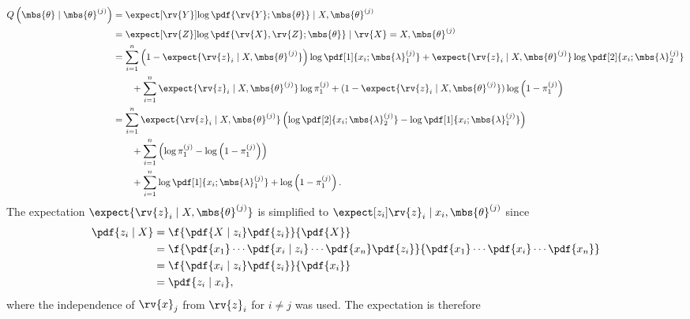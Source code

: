 \documentclass{tufte-handout}
\begin{document}
    \begin{align}
        Q\left(\mbs{\theta}\mid\mbs{\theta}^{(j)}\right) 
        &= \expect[\rv{Y}]{\log \pdf{\rv{Y} ; \mbs{\theta}} \mid X, \mbs{\theta}^{(j)}}\\
        &= \expect[\rv{Z}]{\log \pdf{\rv{X}, \rv{Z} ; \mbs{\theta}} \mid \rv{X}=X, \mbs{\theta}^{(j)}}\\
        &=
        \sum_{i=1}^{n} \left(1-\expect{\rv{z}_{i}\mid X, \mbs{\theta}^{(j)}}\right) \log \pdf[1]{{x}_{i}; \mbs{\lambda}^{(j)}_{1}} + \expect{\rv{z}_{i}\mid X, \mbs{\theta}^{(j)}}\log\pdf[2]{{x}_{i}; \mbs{\lambda}_{2}^{(j)}}
        \nonumber\\&\qquad
        +\sum_{i=1}^{n}\expect{\rv{z}_{i}\mid X, \mbs{\theta}^{(j)}}\log \pi_{1}^{(j)} + (1-\expect{\rv{z}_{i}\mid X, \mbs{\theta}^{(j)}})\log\left( 1-\pi_{1}^{(j)} \right)\\
        &=
        \sum_{i=1}^{n} \expect{\rv{z}_{i}\mid X, \mbs{\theta}^{(j)}} \left( 
            \log\pdf[2]{{x}_{i}; \mbs{\lambda}_{2}^{(j)}}
            -\log \pdf[1]{{x}_{i}; \mbs{\lambda}^{(j)}_{1}}
        \right)
        \nonumber\\&\qquad  
        +\sum_{i=1}^{n}
            \left(
                \log \pi_{1}^{(j)} 
                -\log\left( 1-\pi_{1}^{(j)}\right) 
            \right)
        \nonumber\\&\qquad        
        +\sum_{i=1}^{n} 
            \log \pdf[1]{{x}_{i}; \mbs{\lambda}^{(j)}_{1}} +
            \log\left( 1-\pi_{1}^{(j)}\right).
    \end{align}
    The expectation $\expect{\rv{z}_{i} \mid X, \mbs{\theta}^{(j)}}$ is simplified to $\expect[z_{i}]{\rv{z}_{i} \mid x_{i}, \mbs{\theta}^{(j)}}$ 
    since
    \begin{align}
        \pdf{z_{i}\mid X} 
        &= \f{\pdf{X \mid z_{i}}\pdf{z_{i}}}{\pdf{X}}\\
        &= \f{\pdf{x_{1}}\cdots\pdf{x_{i}\mid z_{i}}\cdots \pdf{x_{n}} \pdf{z_{i}}}{\pdf{x_{1}}\cdots\pdf{x_{i}}\cdots\pdf{x_{n}}}\\
        &= \f{\pdf{x_{i}\mid z_{i}}\pdf{z_{i}}}{\pdf{x_{i}}}\\
        &= \pdf{z_{i}\mid x_{i}},
    \end{align}
    where the independence of $\rv{x}_{j}$ from $\rv{z}_{i}$ for $i\neq j$ was used.
    The expectation is therefore
\end{document}
